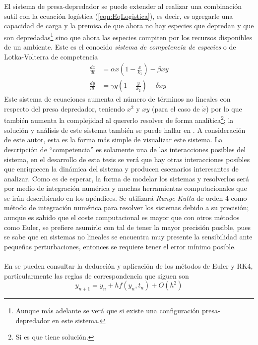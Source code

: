 El sistema de presa-depredador se puede extender al realizar una combinación sutil con la ecuación logística (\ref{eqn:EqLogistica}), es decir, es agregarle una capacidad de carga y la premisa de que ahora no hay especies que depredan y que son depredadas\footnote{Aunque más adelante se verá que si existe una configuración presa-depredador en este sistema.} sino que ahora las especies compiten por los recursos disponibles de un ambiente. Este es el conocido \textit{sistema de competencia de especies} o de Lotka-Volterra de competencia
\begin{equation}\label{eqn:CompentenciaEspecies2x2}
	\begin{split}
		\frac{dx}{dt} &= \alpha x\left (1-\frac{x}{k_1}\right )-\beta xy\\
		\frac{dy}{dt} &= \gamma y\left (1-\frac{y}{k_2}\right )-\delta xy
	\end{split}
\end{equation}
Este sistema de ecuaciones aumenta el número de términos no lineales con respecto del presa depredador, teniendo $x^2$ y $xy$ (para el caso de $\dot{x}$) por lo que también aumenta la complejidad al quererlo resolver de forma analítica\footnote{Si es que tiene solución.}; la solución y análisis de este sistema también se puede hallar en \cite{hirsch2013differential}. A consideración de este autor, esta es la forma más simple de visualizar este sistema. La descripción de ``competencia'' es solamente una de las interacciones posibles del sistema, en el desarrollo de esta tesis se verá que hay otras interacciones posibles que enriquecen la dinámica del sistema y producen escenarios interesantes de analizar.
\newpage
Como es de esperar, la forma de modelar los sistemas y resolverlos será por medio de integración numérica y muchas herramientas computacionales que se irán describiendo en los apéndices. Se utilizará \textit{Runge-Kutta} de orden 4 como método de integración numérica para resolver los sistemas debido a su precisión; aunque es sabido que el coste computacional es mayor que con otros métodos como Euler, se prefiere asumirlo con tal de tener la mayor precisión posible, pues se sabe que en sistemas no lineales se encuentra muy presente la sensibilidad ante pequeñas perturbaciones, entonces se requiere tener el error mínimo posible.\\
\\
En \cite{stickler2016basic} se pueden consultar la deducción y aplicación de los métodos de Euler y RK4, particularmente las reglas de correspondencia que siguen son 
\begin{equation}\label{eqn:Euler}
	y_{n+1}=y_n+hf(y_n,t_n)+O(h^2)
\end{equation}
